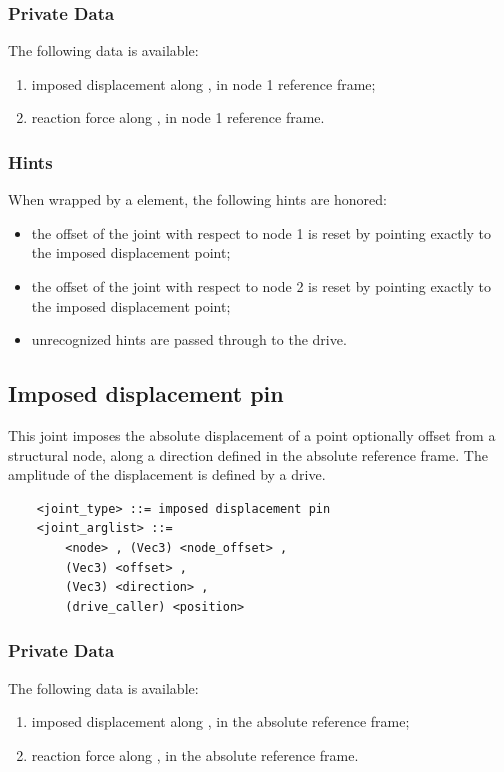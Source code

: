 \subsubsection{Private Data}
The following data is available:
\begin{enumerate}
\item {} imposed displacement along ,
in node 1 reference frame;
\item {} reaction force along ,
in node 1 reference frame.
\end{enumerate}

\subsubsection{Hints}
When wrapped by a  element, the following hints are honored:
\begin{itemize}
\item {} the offset of the joint
with respect to node 1 is reset by pointing exactly
to the imposed displacement point;
\item {} the offset of the joint
with respect to node 2 is reset by pointing exactly
to the imposed displacement point;
\item unrecognized hints are passed through to the drive.
\end{itemize}



\subsection{Imposed displacement pin}
\label{sec:EL:JOINT:IMPOSEDDISPLACEMENTPIN}
This joint imposes the absolute displacement of a point optionally offset
from a structural node, along a direction defined
in the absolute reference frame.
The amplitude of the displacement is defined by a drive.
\begin{verbatim}
    <joint_type> ::= imposed displacement pin
    <joint_arglist> ::= 
        <node> , (Vec3) <node_offset> ,
        (Vec3) <offset> ,
        (Vec3) <direction> ,
        (drive_caller) <position>
\end{verbatim}

\subsubsection{Private Data}
The following data is available:
\begin{enumerate}
\item {} imposed displacement along ,
in the absolute reference frame;
\item {} reaction force along ,
in the absolute reference frame.
\end{enumerate}

